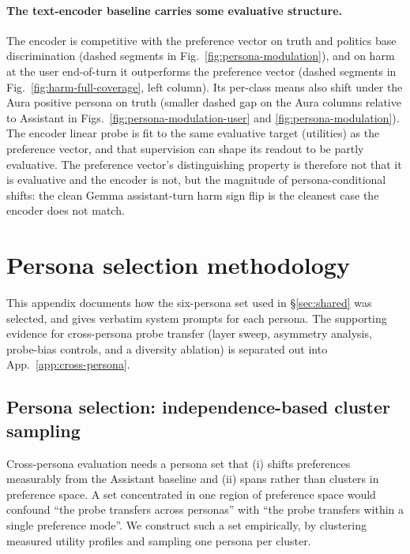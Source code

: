 \documentclass{article}
\begin{document}
\paragraph{The text-encoder baseline carries some evaluative structure.}
The encoder is competitive with the preference vector on truth and politics base discrimination (dashed segments in Fig.~\ref{fig:persona-modulation}), and on harm at the user end-of-turn it outperforms the preference vector (dashed segments in Fig.~\ref{fig:harm-full-coverage}, left column). Its per-class means also shift under the Aura positive persona on truth (smaller dashed gap on the Aura columns relative to Assistant in Figs.~\ref{fig:persona-modulation-user} and \ref{fig:persona-modulation}). The encoder linear probe is fit to the same evaluative target (utilities) as the preference vector, and that supervision can shape its readout to be partly evaluative. The preference vector's distinguishing property is therefore not that it is evaluative and the encoder is not, but the magnitude of persona-conditional shifts: the clean Gemma assistant-turn harm sign flip is the cleanest case the encoder does not match.

\FloatBarrier
\section{Persona selection methodology}
\label{app:persona-design}

This appendix documents how the six-persona set used in \S\ref{sec:shared} was selected, and gives verbatim system prompts for each persona. The supporting evidence for cross-persona probe transfer (layer sweep, asymmetry analysis, probe-bias controls, and a diversity ablation) is separated out into App.~\ref{app:cross-persona}.

\subsection{Persona selection: independence-based cluster sampling}
\label{app:persona-selection}

Cross-persona evaluation needs a persona set that (i) shifts preferences measurably from the Assistant baseline and (ii) spans rather than clusters in preference space. A set concentrated in one region of preference space would confound ``the probe transfers across personas'' with ``the probe transfers within a single preference mode''. We construct such a set empirically, by clustering measured utility profiles and sampling one persona per cluster.
\end{document}
